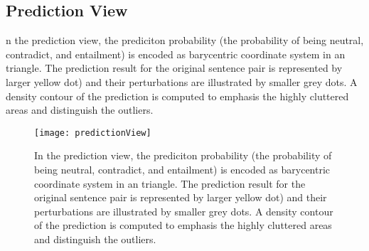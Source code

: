 \subsection{Prediction View}
\label{sec:prediction}
n the prediction view, the prediciton probability (the probability of being neutral, contradict, and entailment) is encoded as barycentric coordinate system in an triangle.
The prediction result for the original sentence pair is represented by larger yellow dot) and their perturbations are illustrated by smaller grey dots.
A density contour of the prediction is computed to emphasis the highly cluttered areas and distinguish the outliers.

\begin{figure}[htbp]
\centering
\vspace{-2mm}
 \texttt{[image: predictionView]}
 \caption{
 In the prediction view, the prediciton probability (the probability of being neutral, contradict, and entailment) is encoded as barycentric coordinate system in an triangle.
 The prediction result for the original sentence pair is represented by larger yellow dot) and their perturbations are illustrated by smaller grey dots.
 A density contour of the prediction is computed to emphasis the highly cluttered areas and distinguish the outliers.
 }
\label{fig:predictionView}
\end{figure}
